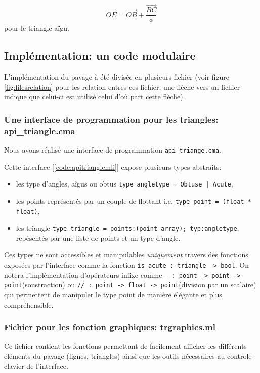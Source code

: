 \documentclass[a4paper,13pt]{article}
\begin{document}
\[ \vec{OE} = \vec{OB} + \frac{\vec{BC}}{\phi}\]
pour le triangle aïgu.
\subsection{Implémentation: un code modulaire}

L'implémentation du pavage à été divisée en plusieurs fichier (voir figure \ref{fig:filesrelation} pour les relation entres ces fichier, une flèche vers un fichier indique que celui-ci est utilisé celui d'où part cette flèche).



\subsubsection{Une interface de programmation pour les triangles: api\_triangle.cma}
Nous avons réalisé une interface de programmation \texttt{api_triange.cma}.

Cette interface [\ref{code:apitrianglemli}] expose plusieurs types abstraits:
\begin{itemize}
	\item les type d'angles, aîgus ou obtus \texttt{type angletype = Obtuse | Acute},
	\item les points représentés par un couple de flottant i.e. \texttt{type point = (float * float)},
	\item les triangle \texttt{type triangle = {points:(point array); typ:angletype}}, repésentés par une liste de points et un type d'angle.
\end{itemize}
Ces types ne sont accessibles et manipulables \emph{uniquement} travers des fonctions exposées par l'interface comme la fonction \texttt{is_acute : triangle -> bool}. On notera l'implémentation d'opérateurs infixe comme \texttt{-- : point -> point -> point}(soustraction) ou \texttt{// : point -> float -> point}(division par un scalaire) qui permettent de manipuler le type point de manière élégante et plus compréhensible.

\subsubsection{Fichier pour les fonction graphiques: trgraphics.ml}
Ce fichier contient les fonctions permettant de facilement afficher les différents éléments du pavage (lignes, triangles) ainsi que les outils nécessaires au controle clavier de l'interface.
\end{document}
